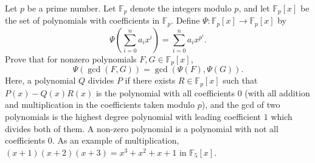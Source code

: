 Let $p$ be a prime number.  Let $\mathbb F_p$ denote the integers modulo $p$, and let $\mathbb F_p[x]$ be the set of polynomials with coefficients in $\mathbb F_p$.  Define $\Psi : \mathbb F_p[x] \to \mathbb F_p[x]$ by \[ \Psi\left( \sum_{i=0}^n a_i x^i \right) = \sum_{i=0}^n a_i x^{p^i}. \] Prove that for nonzero polynomials $F,G \in \mathbb F_p[x]$, \[ \Psi(\gcd(F,G)) = \gcd(\Psi(F), \Psi(G)). \] Here, a polynomial $Q$ divides $P$ if there exists $R \in \mathbb F_p[x]$ such that $P(x) - Q(x) R(x)$ is the polynomial with all coefficients $0$ (with all addition and multiplication in the coefficients taken modulo $p$), and the gcd of two polynomials is the highest degree polynomial with leading coefficient $1$ which divides both of them.  A non-zero polynomial is a polynomial with not all coefficients $0$.  As an example of multiplication, $(x+1)(x+2)(x+3) = x^3+x^2+x+1$ in $\mathbb F_5[x]$.
